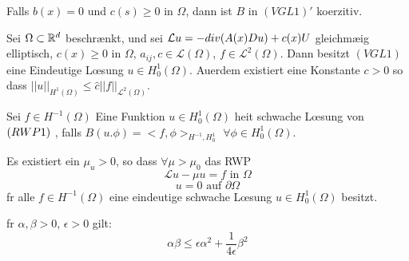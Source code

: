 \begin{lemma}{4.11}
  Falls $b(x)=0$ und $c(s)\geq 0$ in $\Omega$, dann ist $B$ in $(VGL1)'$
  koerzitiv.
\end{lemma}

\begin{satz}{4.12}
  Sei $\Omega\subset\mathbb{R}^d$ beschr\ae nkt, und sei $\mathcal{L} u=-div(A(x)Du)+c(x)U$
  gleichm\ae \s ig elliptisch, $c(x)\geq 0$ in $\Omega$,
  $a_{ij},c\in\mathcal{L}(\Omega)$, $f\in\mathcal{L}^2(\Omega)$. Dann besitzt
  $(VGL1)$ eine Eindeutige L\oe sung $u\in H^1_0(\Omega)$. Au\s erdem existiert eine
  Konstante $c>0$ so dass $||u||_{H^1(\Omega)}\leq\hat c
  ||f||_{\mathcal{L}^2(\Omega)}$.
\end{satz}

\begin{definition}{}
  Sei $f\in H^{-1}(\Omega)$ Eine Funktion $u\in H^1_0(\Omega)$ hei\s t schwache
  L\oe sung von $(RWP 1)~$, falls $B(u.\phi)=<f,\phi>_{H^{-1},H^1_0}$
  $\forall\phi\in H^1_0(\Omega)$.
\end{definition}

\begin{bem}{}
  Es existiert ein $\mu_u>0$, so dass $\forall \mu>\mu_0$ das RWP
  \[\mathcal{L}u-\mu u = f\mbox{ in } \Omega\]
  \[u=0\mbox{ auf }\partial\Omega\]
  f\ue r alle $f\in H^{-1}(\Omega)$ eine eindeutige schwache L\oe sung
  $u\in H^1_0(\Omega)$ besitzt.
\end{bem}

\begin{lem}{}
  f\ue r $\alpha,\beta>0$, $\epsilon>0$ gilt:
  \[\alpha\beta \leq \epsilon\alpha^2+\frac{1}{4\epsilon}\beta^2\]
\end{lem}

